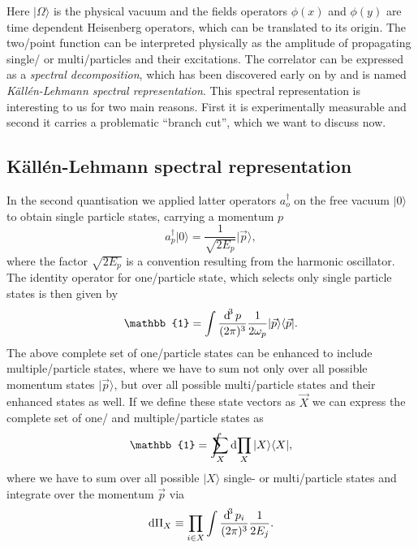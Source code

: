 \documentclass[../../index.tex]{subfiles}
\begin{document}
Here $\vert \Omega \rangle$ is the physical vacuum and the fields operators
$\phi(x)$ and $\phi(y)$ are time dependent Heisenberg operators, which can be
translated to its origin. The two\-/point function can be interpreted physically
as the amplitude of propagating single\-/ or multi\-/particles and their
excitations. The correlator can be expressed as a \textit{spectral
  decomposition}, which has been discovered early on by
\cite{Kallen1952,Lehmann1954} and is named \textit{Källén-Lehmann spectral
  representation}. This spectral representation is interesting to us for two
main reasons. First it is experimentally measurable and second it carries a
problematic ``branch cut'', which we want to discuss now.

\subsection{Källén-Lehmann spectral representation}
In the second quantisation we applied latter operators $a_o^\dagger$ on the free
vacuum $\vert 0 \rangle$ to obtain single particle states, carrying a momentum
$p$
\begin{equation}
  a_p^\dagger \vert 0 \rangle = \frac{1}{\sqrt{2 E_p}}\vert \vec p \rangle,
\end{equation}
where the factor $\sqrt{2 E_p}$ is a convention resulting from the harmonic
oscillator. The identity operator for one\-/particle state, which selects only
single particle states is then given by
\begin{equation}
  \mathbb{1} = \int \frac{\dif^3 p}{(2\pi)^3} \frac{1}{2\omega_p} \vert \vec p \rangle \langle \vec p \vert.
\end{equation}
The above complete set of one\-/particle states can be enhanced to include
multiple\-/particle states, where we have to sum not only over all possible
momentum states $\vert \vec p \rangle$, but over all possible multi\-/particle
states and their enhanced states as well. If we define these state vectors as
$\vec X$ we can express the complete set of one\-/ and multiple\-/particle
states as
\begin{equation}
  \mathbb{1} = \intsum_{X} \dif \prod_X \vert X \rangle \langle  X \vert,
\end{equation}
where we have to sum over all possible $\vert X \rangle$ single- or
multi\-/particle states and integrate over the momentum $\vec p$ via
\begin{equation}
  \dif \Pi_X \equiv \prod_{i \in X} \int \frac{\dif^3 p_i}{(2\pi)^3} \frac{1}{2 E_j}.
\end{equation}
\end{document}
